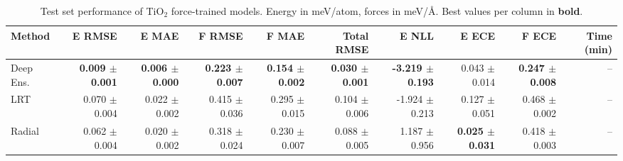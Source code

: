 \begin{table}
\centering
\caption{Test set performance of TiO$_2$ force-trained models. Energy in meV/atom, forces in meV/\AA{}. Best values per column in \textbf{bold}.}
\label{tab:tio2_results}
\begin{tabular}{lrrrrrrrrr}
\toprule
Method & E RMSE & E MAE & F RMSE & F MAE & Total RMSE & E NLL & E ECE & F ECE & Time (min) \\
\midrule
Deep Ens. & \textbf{0.009 $\pm$ 0.001} & \textbf{0.006 $\pm$ 0.000} & \textbf{0.223 $\pm$ 0.007} & \textbf{0.154 $\pm$ 0.002} & \textbf{0.030 $\pm$ 0.001} & \textbf{-3.219 $\pm$ 0.193} & 0.043 $\pm$ 0.014 & \textbf{0.247 $\pm$ 0.008} & -- \\
LRT & 0.070 $\pm$ 0.004 & 0.022 $\pm$ 0.002 & 0.415 $\pm$ 0.036 & 0.295 $\pm$ 0.015 & 0.104 $\pm$ 0.006 & -1.924 $\pm$ 0.213 & 0.127 $\pm$ 0.051 & 0.468 $\pm$ 0.002 & -- \\
Radial & 0.062 $\pm$ 0.004 & 0.020 $\pm$ 0.002 & 0.318 $\pm$ 0.024 & 0.230 $\pm$ 0.007 & 0.088 $\pm$ 0.005 & 1.187 $\pm$ 0.956 & \textbf{0.025 $\pm$ 0.031} & 0.418 $\pm$ 0.003 & -- \\
\bottomrule
\end{tabular}
\end{table}